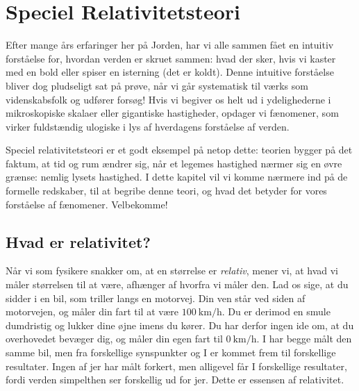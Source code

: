 \documentclass[crop=false, class=memoir]{standalone}
\begin{document}
\chapter{Speciel Relativitetsteori} \label{chap:rel}

Efter mange års erfaringer her på Jorden, har vi alle sammen fået en intuitiv forståelse for, hvordan verden er skruet sammen: hvad der sker, hvis vi kaster med en bold eller spiser en isterning (det er koldt). Denne intuitive forståelse bliver dog pludseligt sat på prøve, når vi går systematisk til værks som videnskabsfolk og udfører forsøg! Hvis vi begiver os helt ud i ydelighederne i mikroskopiske skalaer eller gigantiske hastigheder, opdager vi fænomener, som virker fuldstændig ulogiske i lys af hverdagens forståelse af verden.

Speciel relativitetsteori er et godt eksempel på netop dette: teorien bygger på det faktum, at tid og rum ændrer sig, når et legemes hastighed nærmer sig en øvre grænse: nemlig lysets hastighed. I dette kapitel vil vi komme nærmere ind på de formelle redskaber, til at begribe denne teori, og hvad det betyder for vores forståelse af fænomener. Velbekomme! 

\section{Hvad er relativitet?} %

Når vi som fysikere snakker om, at en størrelse er \emph{relativ}, mener vi, at hvad vi måler størrelsen til at være, afhænger af hvorfra vi måler den. Lad os sige, at du sidder i en bil, som triller langs en motorvej. Din ven står ved siden af motorvejen, og måler din fart til at være $\SI{100}{\kilo \meter \per \hour}$. Du er derimod en smule dumdristig og lukker dine øjne imens du kører. Du har derfor ingen ide om, at du overhovedet bevæger dig, og måler din egen fart til $\SI{0}{\kilo \meter \per \hour}$. I har begge målt den samme bil, men fra forskellige synspunkter og I er kommet frem til forskellige resultater. Ingen af jer har målt forkert, men alligevel får I forskellige resultater, fordi verden simpelthen ser forskellig ud for jer. Dette er essensen af relativitet.
\end{document}
